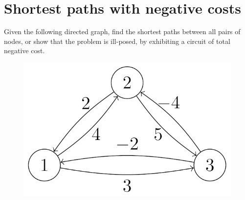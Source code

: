 \documentclass[12pt, a4paper]{report}
\begin{document}
    \newpage

    \section{Shortest paths with negative costs}
        Given the following directed graph, find the shortest paths between all pairs of nodes, or show that the problem is ill-posed, by exhibiting a circuit of total 
        negative cost.
        \begin{figure}[H]
            \centering
            \includegraphics[width=0.3\linewidth]{images/neg1.png}
        \end{figure}
\end{document}
